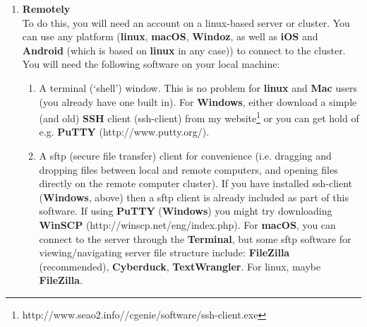 \begin{enumerate}[noitemsep]

\vspace{1mm}
\item \textbf{Remotely}
\\To do this, you will need an account on a linux-based server or cluster. You can use any platform (\textbf{linux}, \textbf{macOS}, \textbf{Windoz}, as well as \textbf{iOS} and \textbf{Android} (which is based on \textbf{linux} in any case)) to connect to the cluster. You will need the following software on your local machine:
\vspace{1mm}
\begin{enumerate}[noitemsep]
\setlength{\itemindent}{.2in}
\item A terminal (‘shell’) window. This is no problem for \textbf{linux} and \textbf{Mac} users (you already have one built in). For \textbf{Windows}, either download a simple (and old) \textbf{SSH} client (ssh-client) from my website\footnote{http://www.seao2.info//cgenie/software/ssh-client.exe} or you can get hold of e.g. \textbf{PuTTY} (http://www.putty.org/).
\item A sftp (secure file transfer) client for convenience (i.e. dragging and dropping files between local and remote computers, and opening files directly on the remote computer cluster). If you have installed ssh-client (\textbf{Windows}, above) then a sftp client is already included as part of this software. If using \textbf{PuTTY} (\textbf{Windows}) you might try downloading \textbf{WinSCP} (http://winscp.net/eng/index.php). For \textbf{macOS}, you can connect to the server through the \textbf{Terminal}, but some sftp software for viewing/navigating server file structure include: \textbf{FileZilla} (recommended), \textbf{Cyberduck}, \textbf{TextWrangler}. For linux, maybe \textbf{FileZilla}.
\end{enumerate}


\end{enumerate}
